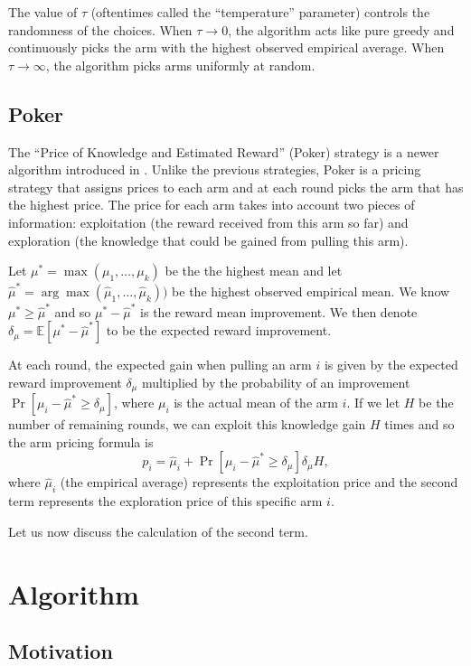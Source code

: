 \documentclass[12pt]{article}
\begin{document}
The value of $\tau$ (oftentimes called the ``temperature'' parameter) controls the randomness of the choices.  When $\tau \to 0$, the algorithm
acts like pure greedy and continuously picks the arm with the highest observed empirical average.  When $\tau \to \infty$, the algorithm picks
arms uniformly at random.

\subsection{Poker}
The ``Price of Knowledge and Estimated Reward'' (Poker) strategy is a newer algorithm introduced in \cite{Mohri}.  Unlike the previous strategies,
Poker is a pricing strategy that assigns prices to each arm and at each round picks the arm that has the highest price.  The price for each arm 
takes into account two pieces of information: exploitation (the reward received from this arm so far) and exploration (the knowledge that could be gained
from pulling this arm).  

Let $\mu^{*} = \max(\mu_1, \ldots, \mu_k)$ be the the highest mean and let $\hat{\mu}^{*} = \arg \max(\hat{\mu}_1, \ldots, \hat{\mu}_k))$ be the highest 
observed empirical mean.  We know $\mu^{*} \ge \hat{\mu}^{*}$ and so $\mu^{*} - \hat{\mu}^{*}$ is the reward mean improvement.  We then denote 
$\delta_{\mu} = \mathbb{E}[\mu^{*} - \hat{\mu}^{*}]$ to be the expected reward improvement.

At each round, the expected gain when pulling an arm $i$ is given by the expected reward improvement $\delta_{\mu}$ multiplied by the probability of an
improvement $\Pr[\mu_i - \hat{\mu}^{*} \ge \delta_{\mu}]$, where $\mu_i$ is the actual mean of the arm $i$.  If we let $H$ be the number of remaining rounds, 
we can exploit this knowledge gain $H$ times and so the arm pricing formula is 
$$
p_i = \hat{\mu}_i + \Pr[\mu_i - \hat{\mu}^{*} \ge \delta_{\mu}] \delta_{\mu} H,
$$
where $\hat{\mu}_i$ (the empirical average) represents the exploitation price and the second term represents the exploration price of this specific arm $i$. 

Let us now discuss the calculation of the second term.
\section{Algorithm}

\subsection{Motivation}
\end{document}
